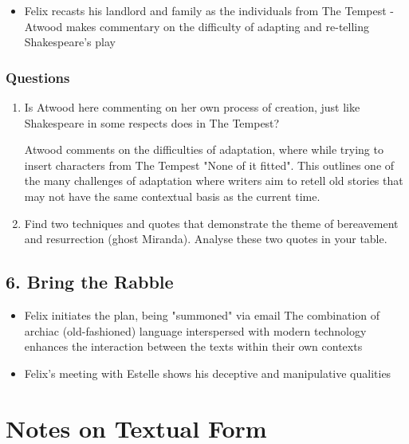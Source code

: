 		\begin{itemize}
			\item Felix recasts his landlord and family as the individuals from The Tempest - Atwood makes commentary on the difficulty of adapting and re-telling Shakespeare's play
		\end{itemize}

		\subsubsection{Questions}
		
			\begin{enumerate}
				\item Is Atwood here commenting on her own process of creation, just like Shakespeare in some respects does in The Tempest?

					Atwood comments on the difficulties of adaptation, where while trying to insert characters from The Tempest "None of it fitted". This outlines one of the many challenges of adaptation where writers aim to retell old stories that may not have the same contextual basis as the current time.
				\item Find two techniques and quotes that demonstrate the theme of bereavement and resurrection (ghost Miranda). Analyse these two quotes in your table.

			\end{enumerate}

	\subsection{6. Bring the Rabble}
	
		\begin{itemize}
			\item Felix initiates the plan, being "summoned" via email
				\subitem The combination of archiac (old-fashioned) language interspersed with modern technology enhances the interaction between the texts within their own contexts
			\item Felix's meeting with Estelle shows his deceptive and manipulative qualities
		\end{itemize}

\section{Notes on Textual Form}


